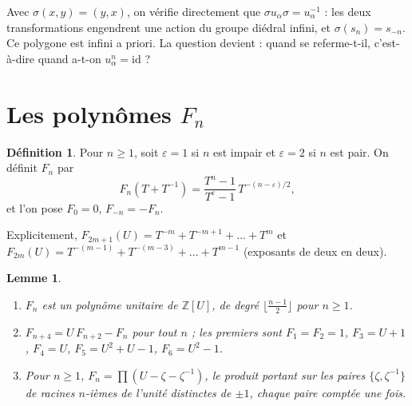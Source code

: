 \documentclass[11pt,a4paper]{article}
\theoremstyle{plain}
\newtheorem{lemme}[theoreme]{Lemme}
\theoremstyle{definition}
\newtheorem{definition}[theoreme]{Définition}
\theoremstyle{remark}
\newcommand{\Z}{\mathbb{Z}}
\begin{document}
Avec $\sigma(x,y)=(y,x)$, on vérifie directement que $\sigma u_\alpha\sigma=u_\alpha^{-1}$ : les deux transformations engendrent une action du groupe diédral infini, et $\sigma(s_n)=s_{-n}$. Ce polygone est infini a priori. La question devient : quand se referme-t-il, c'est-à-dire quand a-t-on $u_\alpha^n=\mathrm{id}$ ?

\section{Les polynômes \texorpdfstring{$F_n$}{Fn}}

\begin{definition}\label{def:F}
Pour $n\geq1$, soit $\varepsilon=1$ si $n$ est impair et $\varepsilon=2$ si $n$ est pair. On définit $F_n$ par
\[
  F_n(T+T^{-1})=\frac{T^n-1}{T^\varepsilon-1}\,T^{-(n-\varepsilon)/2},
\]
et l'on pose $F_0=0$, $F_{-n}=-F_n$.
\end{definition}

Explicitement, $F_{2m+1}(U)=T^{-m}+T^{-m+1}+\dots+T^m$ et $F_{2m}(U)=T^{-(m-1)}+T^{-(m-3)}+\dots+T^{m-1}$ (exposants de deux en deux).

\begin{lemme}\label{lem:F}
\begin{enumerate}[nosep]
\item $F_n$ est un polynôme unitaire de $\Z[U]$, de degré $\lfloor\frac{n-1}2\rfloor$ pour $n\geq1$.
\item $F_{n+4}=U\,F_{n+2}-F_n$ pour tout $n$ ; les premiers sont $F_1=F_2=1$, $F_3=U+1$, $F_4=U$, $F_5=U^2+U-1$, $F_6=U^2-1$.
\item Pour $n\geq1$, $F_n=\prod(U-\zeta-\zeta^{-1})$, le produit portant sur les paires $\{\zeta,\zeta^{-1}\}$ de racines $n$-ièmes de l'unité distinctes de $\pm1$, chaque paire comptée une fois.
\end{enumerate}
\end{lemme}
\end{document}
